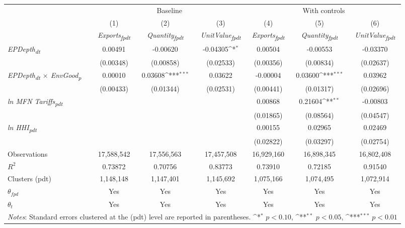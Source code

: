 {
\def\sym#1{\ifmmode^{#1}\else\(^{#1}\)\fi}
\begin{tabular}{l*{6}{c}}
\toprule
&\multicolumn{3}{c}{Baseline}&\multicolumn{3}{c}{With controls}\\\cmidrule(lr){2-4}\cmidrule(lr){5-7}
&(1)&(2)&(3)&(4)&(5)&(6)\\
&\textit{Exports\textsubscript{fpdt}}&\textit{Quantity\textsubscript{fpdt}}&\textit{UnitValue\textsubscript{fpdt}}&\textit{Exports\textsubscript{fpdt}}&\textit{Quantity\textsubscript{fpdt}}&\textit{UnitValue\textsubscript{fpdt}}\\
\midrule
\textit{EPDepth\textsubscript{dt}} & 0.00491 & -0.00620 & -0.04305\sym{*} & 0.00504 & -0.00553 & -0.03370\\
 & (0.00348) & (0.00858) & (0.02533) & (0.00356) & (0.00834) & (0.02637)\\
\addlinespace
\textit{EPDepth\textsubscript{dt} $\times$ EnvGood\textsubscript{p}} & 0.00010 & 0.03608\sym{***} & 0.03622 & -0.00004 & 0.03600\sym{***} & 0.03962\\
 & (0.00433) & (0.01344) & (0.02531) & (0.00441) & (0.01317) & (0.02696)\\
\addlinespace
\textit{ln MFN Tariffs\textsubscript{pdt}} &  &  &  & 0.00868 & 0.21604\sym{**} & -0.00803\\
 &  &  &  & (0.01865) & (0.08564) & (0.04547)\\
\addlinespace
\textit{ln HHI\textsubscript{pdt}} &  &  &  & 0.00155 & 0.02965 & 0.02469\\
 &  &  &  & (0.02822) & (0.03297) & (0.02754)\\
\midrule
Observations & 17,588,542 & 17,556,563 & 17,457,508 & 16,929,160 & 16,898,345 & 16,802,408\\
$R^{2}$ & 0.73872 & 0.70756 & 0.83773 & 0.73910 & 0.72185 & 0.91540\\
Clusters (pdt) & 1,148,148 & 1,147,401 & 1,145,692 & 1,075,166 & 1,074,495 & 1,072,914\\
$\theta_{fpd}$ & Yes & Yes & Yes & Yes & Yes & Yes\\
$\theta_{t}$ & Yes & Yes & Yes & Yes & Yes & Yes\\
\bottomrule
\multicolumn{7}{l}{\footnotesize \textit{Notes}: Standard errors clustered at the (pdt) level are reported in parentheses. \sym{*} \(p<0.10\), \sym{**} \(p<0.05\), \sym{***} \(p<0.01\)}\\
\end{tabular}
}
